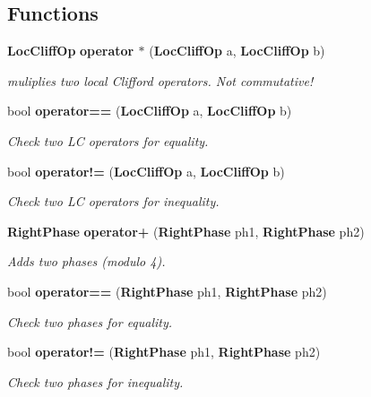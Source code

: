 \subsection*{Functions}
\begin{CompactItemize}
\item 
{\bf Loc\-Cliff\-Op} {\bf operator $\ast$} ({\bf Loc\-Cliff\-Op} a, {\bf Loc\-Cliff\-Op} b)\label{loccliff_8h_a18}

\begin{CompactList}\small\item\em muliplies two local Clifford operators. Not commutative! \item\end{CompactList}\item 
bool {\bf operator==} ({\bf Loc\-Cliff\-Op} a, {\bf Loc\-Cliff\-Op} b)\label{loccliff_8h_a19}

\begin{CompactList}\small\item\em Check two LC operators for equality. \item\end{CompactList}\item 
bool {\bf operator!=} ({\bf Loc\-Cliff\-Op} a, {\bf Loc\-Cliff\-Op} b)\label{loccliff_8h_a20}

\begin{CompactList}\small\item\em Check two LC operators for inequality. \item\end{CompactList}\item 
{\bf Right\-Phase} {\bf operator+} ({\bf Right\-Phase} ph1, {\bf Right\-Phase} ph2)\label{loccliff_8h_a21}

\begin{CompactList}\small\item\em Adds two phases (modulo 4). \item\end{CompactList}\item 
bool {\bf operator==} ({\bf Right\-Phase} ph1, {\bf Right\-Phase} ph2)\label{loccliff_8h_a22}

\begin{CompactList}\small\item\em Check two phases for equality. \item\end{CompactList}\item 
bool {\bf operator!=} ({\bf Right\-Phase} ph1, {\bf Right\-Phase} ph2)\label{loccliff_8h_a23}

\begin{CompactList}\small\item\em Check two phases for inequality. \item\end{CompactList}\end{CompactItemize}
